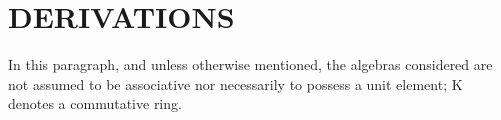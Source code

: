 \section{DERIVATIONS}

In this paragraph, and unless otherwise mentioned, the algebras considered are not assumed to be associative nor necessarily to possess a unit element; K denotes a commutative ring.

